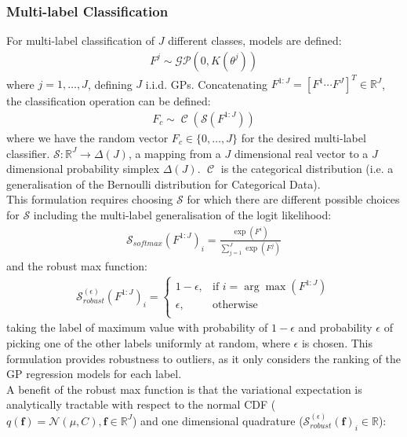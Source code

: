 \documentclass{article}
\newcommand{\Cat}{\operatorname{\mathcal{C}}}
\numberwithin{equation}{section}
\begin{document}
\subsubsection{Multi-label Classification}
For multi-label classification of $J$ different classes, models are defined:
\begin{align}
F^{j} \sim \mathcal{GP}(0, K(\theta^{j}))
\end{align}
where $j=1, \dots, J$, defining $J$ i.i.d. GPs.
Concatenating $F^{1:J} = [F^1 \cdots F^J]^T \in \mathbb{R}^J$, the classification operation can be defined:
\begin{align}
F_c \sim \Cat (\mathcal{S}(F^{1:J}))
\end{align}
where we have the random vector $F_c \in \{0, \dots, J\}$ for the desired multi-label classifier. $\mathcal{S}: \mathbb{R}^J \rightarrow \Delta(J)$, a mapping from a $J$ dimensional real vector to a $J$ dimensional probability simplex $\Delta(J)$. $\Cat$ is the categorical distribution (i.e. a generalisation of the Bernoulli distribution for Categorical Data).
\\This formulation requires choosing $\mathcal{S}$ for which there are different possible choices for $\mathcal{S}$ including the multi-label generalisation of the logit likelihood:
\begin{align}
\mathcal{S}_{softmax}(F^{1:J})_i = \frac{\exp(F^{i})}{\sum_{j=1}^{J} \exp(F^{j})}
\end{align}
and the robust max function:
\begin{align}
\mathcal{S}_{robust}^{(\epsilon)}(F^{1:J})_i = \begin{cases}
      1-\epsilon, &  \text{if } i = \arg \max(F^{1:J}) \\
      \epsilon, & \text{otherwise} \\
   \end{cases}
\end{align}
taking the label of maximum value with probability of $1-\epsilon$ and probability $\epsilon$ of picking one of the other labels uniformly at random, where $\epsilon$ is chosen.
This formulation provides robustness to outliers, as it only considers the ranking of the GP regression models for each label.
\\A benefit of the robust max function is that the variational expectation is analytically tractable with respect to the normal CDF ($q(\mathbf{f}) = \mathcal{N}(\mu, C), \mathbf{f} \in \mathbb{R}^J$) and one dimensional quadrature ($\mathcal{S}_{robust}^{(\epsilon)}(\mathbf{f})_i \in \mathbb{R}$):
\end{document}
